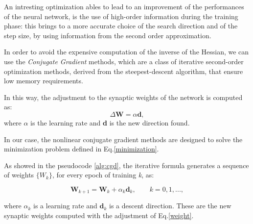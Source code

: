 		An intresting optimization ables to lead to an improvement of the performances of the neural network, is the use of high-order information during the training phase: this brings to a more accurate choice of the search direction and of the step size, by using information from the second order approximation.

		In order to avoid the expensive computation of the inverse of the Hessian, we can use the \textit{Conjugate Gradient} methods, which are a class of iterative second-order optimization methods, derived from the steepest-descent algorithm, that ensure low memory requirements.

		In this way, the adjustment to the synaptic weights of the network is computed as:
		 \begin{equation}
		 	\label{weight}
		    \Delta\textbf{W} = \alpha\textbf{d},
		 \end{equation}
		where $\alpha$ is the learning rate and \textbf{d} is the new direction found.

		In our case, the nonlinear conjugate gradient methods are designed to solve the minimization problem defined in Eq.\ref{minimization}.

		As showed in the pseudocode \ref{alg:cgd}, the iterative formula generates a sequence of weights $\{W_k\}$, for every epoch of training \textit{k}, as:

		\begin{equation}
			\textbf{W}_{k+1} = \textbf{W}_{k} + \alpha_k\textbf{d}_k, \text{  }\text{  }\text{  } \textit{k} = 0,1,...,
		\end{equation}

		where $\alpha_k$ is a learning rate and $\textbf{d}_k$ is a descent direction. These are the new synaptic weights computed with the adjustment of Eq.\ref{weight}.


